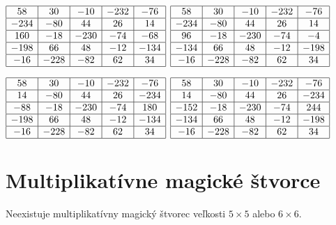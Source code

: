 \begin{center}
$\begin{array}{ |c|c|c|c|c| }
\hline
58 & 30 & -10 & -232 & -76 \\ 
\hline
-234 & -80 & 44 & 26 & 14  \\ 
\hline
160 & -18 & -230 & -74 & -68 \\ 
\hline
-198 & 66 & 48 & -12 & -134 \\ 
\hline
-16 & -228 & -82 & 62 & 34 \\ 
\hline
\end{array}$
{}
$\begin{array}{ |c|c|c|c|c| } 
\hline
58 & 30 & -10 & -232 & -76 \\ 
\hline
-234 & -80 & 44 & 26 & 14  \\ 
\hline
96 & -18 & -230 & -74 & -4 \\ 
\hline
-134 & 66 & 48 & -12 & -198 \\ 
\hline
-16 & -228 & -82 & 62 & 34 \\ 
\hline
\end{array}$
\end{center}
\begin{center}
$\begin{array}{ |c|c|c|c|c| }
\hline
58 & 30 & -10 & -232 & -76 \\ 
\hline
14 & -80 & 44 & 26 & -234 \\ 
\hline
-88 & -18 & -230 & -74 & 180 \\ 
\hline
-198 & 66 & 48 & -12 & -134 \\ 
\hline
-16 & -228 & -82 & 62 & 34 \\ 
\hline
\end{array}$
{}
$\begin{array}{ |c|c|c|c|c| } 
\hline
58 & 30 & -10 & -232 & -76 \\ 
\hline
14 & -80 & 44 & 26 & -234 \\ 
\hline
-152 & -18 & -230 & -74 & 244 \\ 
\hline
-134 & 66 & 48 & -12 & -198 \\ 
\hline
-16 & -228 & -82 & 62 & 34 \\ 
\hline
\end{array}$
\end{center}

\section{Multiplikatívne magické štvorce}

\begin{hypothesis} Neexistuje multiplikatívny magický štvorec veľkosti $5 \times 5$ alebo $6 \times 6$.
\end{hypothesis} 

